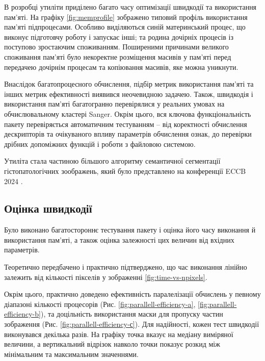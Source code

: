 В розробці утиліти приділено багато часу оптимізації швидкодії та використання пам'яті. 
На графіку \ref{fig:memprofile} зображено типовий профіль використання пам'яті підпроцесами.
Особливо виділяються синій материнський процес, що виконує підготовчу роботу і запускає інші; 
та родина дочірніх процесів із поступово зростаючим споживанням.
Поширеними причинами великого споживання пам'яті було некоректне розміщення масивів у пам'яті перед передачею дочірнім процесам 
та копіювання масивів, яке можна уникнути. 

Внаслідок багатопроцесного обчислення, підбір метрик використання пам'яті та інших метрик ефективності виявився неочевидною задачею.
Також, швидкодія і використання пам'яті багатогранно перевірялися у реальних умовах на обчислювальному кластері Sanger.
Окрім цього, вся ключова функціональність пакету перевіряється автоматичним тестуванням -- від коректності обчислення дескрипторів та очікуваного впливу параметрів обчислення ознак, 
до перевірки дрібних допоміжних функцій і роботи з файловою системою. 

Утиліта стала частиною більшого алгоритму семантичної сегментації гістопатологічних зоображень, 
який було представлено на конференції ECCB 2024 \cite{fastlbp2024}.

\subsection{Оцінка швидкодії}\label{section2.2d}
Було виконано багатостороннє тестування пакету і оцінка його часу виконання й використання пам'яті, 
а також оцінка залежності цих величин від вхідних параметрів.

Теоретично передбачено і практично підтверджено, що час виконання лінійно залежить від кількості пікселів у зображенні \ref{fig:time-vs-npixels}.

Окрім цього, практично доведено ефективність паралелізації обчислень у певному діапазоні кількості процесорів (Рис. \ref{fig:parallell-efficiency-a}, \ref{fig:parallell-efficiency-b}),
та доцільність використання маски для пропуску частин зображення (Рис. \ref{fig:parallell-efficiency-с}).
Для надійності, кожен тест швидкодії виконувався декілька разів. На графіку точка вказує на медіану виміряної величини, 
а вертикальний відрізок навколо точки показує розкид між мінімальним та максимальним значеннями.

